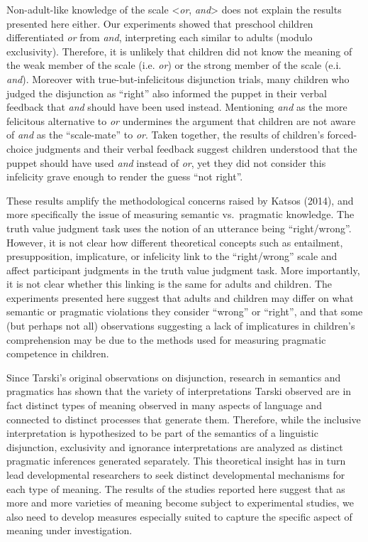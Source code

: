 \documentclass[,man,floatsintext]{apa6}
\begin{document}
Non-adult-like knowledge of the scale \textless{}\emph{or}, \emph{and}\textgreater{} does not explain the results presented here either. Our experiments showed that preschool children differentiated \emph{or} from \emph{and}, interpreting each similar to adults (modulo exclusivity). Therefore, it is unlikely that children did not know the meaning of the weak member of the scale (i.e. \emph{or}) or the strong member of the scale (e.i. \emph{and}). Moreover with true-but-infelicitous disjunction trials, many children who judged the disjunction as \enquote{right} also informed the puppet in their verbal feedback that \emph{and} should have been used instead. Mentioning \emph{and} as the more felicitous alternative to \emph{or} undermines the argument that children are not aware of \emph{and} as the \enquote{scale-mate} to \emph{or}. Taken together, the results of children's forced-choice judgments and their verbal feedback suggest children understood that the puppet should have used \emph{and} instead of \emph{or}, yet they did not consider this infelicity grave enough to render the guess \enquote{not right}.

These results amplify the methodological concerns raised by Katsos (2014), and more specifically the issue of measuring semantic vs.~pragmatic knowledge. The truth value judgment task uses the notion of an utterance being \enquote{right/wrong}. However, it is not clear how different theoretical concepts such as entailment, presupposition, implicature, or infelicity link to the \enquote{right/wrong} scale and affect participant judgments in the truth value judgment task. More importantly, it is not clear whether this linking is the same for adults and children. The experiments presented here suggest that adults and children may differ on what semantic or pragmatic violations they consider \enquote{wrong} or \enquote{right}, and that some (but perhaps not all) observations suggesting a lack of implicatures in children's comprehension may be due to the methods used for measuring pragmatic competence in children.

Since Tarski's original observations on disjunction, research in semantics and pragmatics has shown that the variety of interpretations Tarski observed are in fact distinct types of meaning observed in many aspects of language and connected to distinct processes that generate them. Therefore, while the inclusive interpretation is hypothesized to be part of the semantics of a linguistic disjunction, exclusivity and ignorance interpretations are analyzed as distinct pragmatic inferences generated separately. This theoretical insight has in turn lead developmental researchers to seek distinct developmental mechanisms for each type of meaning. The results of the studies reported here suggest that as more and more varieties of meaning become subject to experimental studies, we also need to develop measures especially suited to capture the specific aspect of meaning under investigation.
\end{document}
